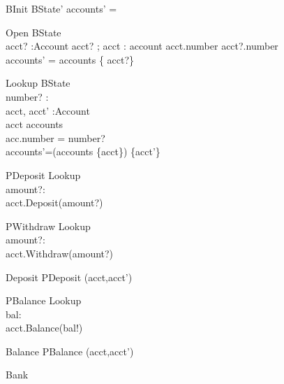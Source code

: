 \documentclass[a4paper,10pt]{article}
\begin{document}
\begin{schema}{BInit}
 BState'
\where
accounts' = \emptyset 
\end{schema}


\begin{schema}{Open}
 \Delta BState \\
acct? :Account
\where
acct? \neq \ohcircnull ;
\forall acct : account \spot acct.number \neq acct?.number \\
accounts' = accounts \cup \{ acct?\}
\end{schema}


\begin{schema}{Lookup}
 \Delta BState \\
number? : \nat\\
acct, acct' :Account\\
\where
acct \in accounts \\
acc.number = number?\\
accounts'=(accounts \setminus \{acct\}) \cup \{acct'\}\\
\end{schema}


\begin{schema}{PDeposit}
 Lookup\\
 amount?:\nat\\
 \where
 acct.Deposit(amount?)
\end{schema}

\begin{schema}{PWithdraw}
 Lookup\\
 amount?:\nat\\
 \where
 acct.Withdraw(amount?)
\end{schema}


\begin{schema}{Deposit}
 PDeposit \setminus (acct,acct')\\
\end{schema}


\begin{schema}{PBalance}
 Lookup\\
 bal:\nat\\
 \where
 acct.Balance(bal!)
\end{schema}

\begin{schema}{Balance}
 PBalance \setminus (acct,acct') \\
\end{schema}


\begin{circus}
\circprocess Bank \circdef \circbegin\\
\end{circus}
\end{document}
